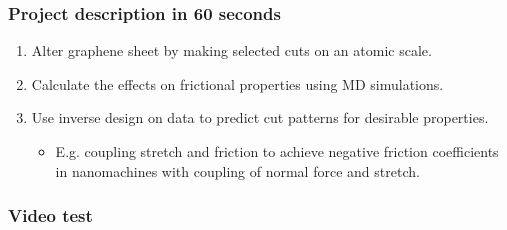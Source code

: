 \documentclass[
	11pt, %
]{beamer}
\begin{document}
\begin{frame}
	\frametitle{Project description in 60 seconds}

	\begin{enumerate}
		\item Alter graphene sheet by making selected cuts on an atomic scale. %
		\item Calculate the effects on frictional properties using MD simulations.
		\item Use inverse design on data to predict cut patterns for desirable properties.
		\begin{itemize}
			\item E.g. coupling stretch and friction to achieve negative friction coefficients in nanomachines with coupling of normal force and stretch. 
		\end{itemize} 
	\end{enumerate}

	
\end{frame}



\begin{frame}
	\frametitle{Video test}

	

\end{frame}


\end{document}
